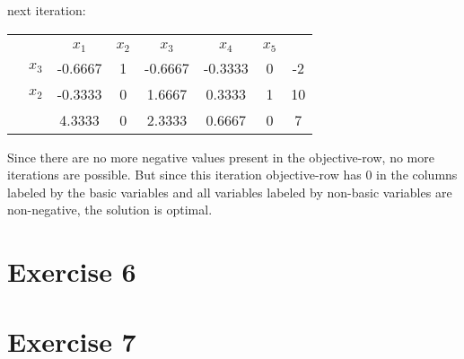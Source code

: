 \documentclass{article}
\begin{document}
    next iteration:

    \begin{center}
        \begin{tabular}{ c | c | c c c c c | c | }
            \multicolumn{1}{c}{}  & \multicolumn{1}{c}{}  &    & &     & \multicolumn{1}{c}{}\\
            \cline{2-8}
            &  & $x_1$ & $x_2$ & $x_3$ & $x_4$ & $x_5$ &\\
            \cline{2-8}
            & $x_3$ & -0.6667& 1& -0.6667& -0.3333& 0& -2\\
            & $x_2$ & -0.3333& 0& 1.6667& 0.3333& 1& 10\\
            \cline{2-8}
            & & 4.3333 & 0& 2.3333& 0.6667& 0& 7\\
            \cline{2-8}
        \end{tabular}
    \end{center}

    Since there are no more negative values present in the objective-row, no
    more iterations are possible. But since this iteration objective-row has 0
    in the columns labeled by the basic variables and all variables labeled by
    non-basic variables are non-negative, the solution is optimal.


\section*{Exercise 6}
\section*{Exercise 7}
\end{document}
